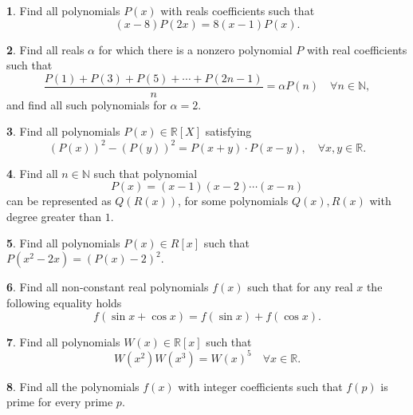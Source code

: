 \documentclass{article}
\theoremstyle{definition}
\newtheorem{p}{}
\begin{document}
\begin{p}
Find all polynomials $ P(x)$ with reals coefficients such that
\[(x-8)P(2x)=8(x-1)P(x).\]
\end{p}


\begin{p}
Find all reals $ \alpha$ for which there is a nonzero polynomial $P$ with real coefficients such that 
\[\frac{P(1)+P(3)+P(5)+\cdots+P(2n-1)}{n}=\alpha P(n) \quad \forall n \in \mathbb N,\]
and find all such polynomials for $ \alpha=2$.
\end{p}





\begin{p}
Find all polynomials $ P(x) \in \mathbb{R}[X]$ satisfying 
\[ (P(x))^2-(P(y))^2=P(x+y)\cdot P(x-y) ,\quad  \forall x,y \in \mathbb R.\]
\end{p}





\begin{p}
Find all $ n\in\mathbb{N}$ such that polynomial
\[ P(x) = (x - 1)(x - 2) \cdots (x -n)\]
can be represented as $Q(R(x))$, for some polynomials $ Q(x),R(x)$ with degree greater than $1$.
\end{p}





\begin{p}
Find all polynomials $ P(x) \in R[x]$ such that $ P(x^2-2x)=\left( P(x)-2 \right)^2.$
\end{p}





\begin{p}
Find all non-constant real polynomials $ f(x)$ such that for any real $ x$ the following equality holds
\[ f(\sin x +\cos x) = f(\sin x) + f(\cos x).\]
\end{p}





\begin{p}
Find all polynomials $ W(x)\in \mathbb R[x]$ such that
\[W(x^2)W(x^3)=W(x)^5 \quad \forall x \in \mathbb R.\]
\end{p}





\begin{p}
Find all the polynomials $f(x)$ with integer coefficients such that $f(p)$ is prime for every prime $p.$
\end{p}
\end{document}
